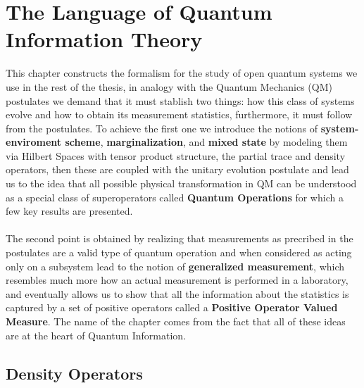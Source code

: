 \chapter{The Language of Quantum Information Theory}
This chapter constructs the formalism for the study of open quantum systems we use in the rest of the thesis, in analogy with the
Quantum Mechanics (QM) postulates we demand that it must stablish two things: how this class of systems evolve and how to obtain its measurement
statistics, furthermore, it must follow from the postulates. To achieve the first one we introduce the notions of \textbf{system-enviroment scheme}, \textbf{marginalization}, and
\textbf{mixed state} by modeling them via Hilbert Spaces with tensor product structure, the partial trace and density operators, then these
are coupled with the unitary evolution postulate and lead us to the idea that all possible physical transformation in QM can be understood as a
special class of superoperators called \textbf{Quantum Operations} for which a few key results are presented.
\\\\
The second point is
obtained by realizing that measurements as precribed in the postulates are a valid type of quantum operation and when considered
as acting only on a subsystem lead to the notion of \textbf{generalized measurement}, which resembles much more how an actual measurement is
performed in a laboratory, and eventually allows us to show that all the information about the statistics is captured by
a set of positive operators called a \textbf{Positive Operator Valued Measure}. The name of the chapter comes from the fact that all
of these ideas are at the heart of Quantum Information.
\section{Density Operators}
